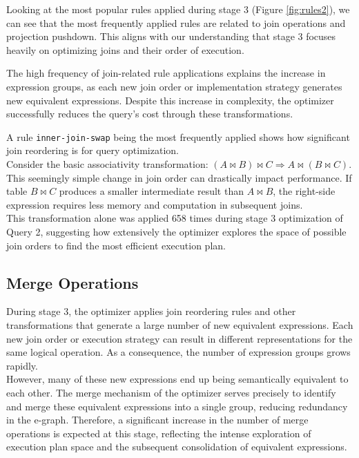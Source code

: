 \documentclass[a4paper,12pt]{scrreprt}
\begin{document}
Looking at the most popular rules applied during stage 3 (Figure \ref{fig:rules2}), we can see that the most frequently applied rules are related to join operations and projection pushdown. This aligns with our understanding that stage 3 focuses heavily on optimizing joins and their order of execution.

The high frequency of join-related rule applications explains the increase in expression groups, as each new join order or implementation strategy generates new equivalent expressions. Despite this increase in complexity, the optimizer successfully reduces the query's cost through these transformations.

A rule \texttt{inner-join-swap} being the most frequently applied shows how significant join reordering is for query optimization. \\

Consider the basic associativity transformation: $(A \bowtie B) \bowtie C \Rightarrow A \bowtie (B \bowtie C)$. This seemingly simple change in join order can drastically impact performance. If table $B \bowtie C$ produces a smaller intermediate result than $A \bowtie B$, the right-side expression requires less memory and computation in subsequent joins. \\
This transformation alone was applied 658 times during stage 3 optimization of Query 2, suggesting how extensively the optimizer explores the space of possible join orders to find the most efficient execution plan.

\subsection{Merge Operations}


During stage 3, the optimizer applies join reordering rules and other transformations that generate a large number of new equivalent expressions. Each new join order or execution strategy can result in different representations for the same logical operation. As a consequence, the number of expression groups grows rapidly. \\
However, many of these new expressions end up being semantically equivalent to each other. The merge mechanism of the optimizer serves precisely to identify and merge these equivalent expressions into a single group, reducing redundancy in the e-graph. Therefore, a significant increase in the number of merge operations is expected at this stage, reflecting the intense exploration of execution plan space and the subsequent consolidation of equivalent expressions.
\end{document}
